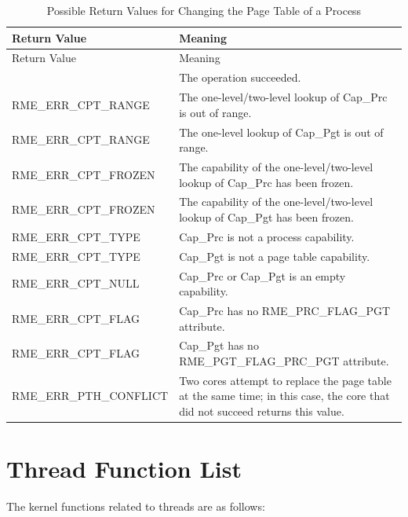 \begin{xltabular}{\textwidth}{@{}>{\hsize\raggedright\arraybackslash}X>{\hsize\raggedright\arraybackslash}X@{}}
\caption{Possible Return Values for Changing the Page Table of a Process}\label{tab:4-17-change-process-page-table-return-values}\\
\toprule
Return Value & Meaning\tabularnewline
\endfirsthead
\toprule
Return Value & Meaning\tabularnewline
\midrule
\endhead
\bottomrule
{} & The operation succeeded.\tabularnewline
    RME\_ERR\_CPT\_RANGE & The one-level/two-level lookup of Cap\_Prc is out of range.\tabularnewline
    RME\_ERR\_CPT\_RANGE & The one-level lookup of Cap\_Pgt is out of range.\tabularnewline
    RME\_ERR\_CPT\_FROZEN & The capability of the one-level/two-level lookup of Cap\_Prc has been frozen.\tabularnewline
    RME\_ERR\_CPT\_FROZEN & The capability of the one-level/two-level lookup of Cap\_Pgt has been frozen.\tabularnewline
    RME\_ERR\_CPT\_TYPE & Cap\_Prc is not a process capability.\tabularnewline
    RME\_ERR\_CPT\_TYPE & Cap\_Pgt is not a page table capability.\tabularnewline
    RME\_ERR\_CPT\_NULL & Cap\_Prc or Cap\_Pgt is an empty capability.\tabularnewline
    RME\_ERR\_CPT\_FLAG & Cap\_Prc has no RME\_PRC\_FLAG\_PGT attribute.\tabularnewline
    RME\_ERR\_CPT\_FLAG & Cap\_Pgt has no RME\_PGT\_FLAG\_PRC\_PGT attribute.\tabularnewline
    RME\_ERR\_PTH\_CONFLICT & Two cores attempt to replace the page table at the same time; in this case, the core that did not succeed returns this value.\tabularnewline
\end{xltabular}
\nopagebreak[4]

\section{Thread Function List}\label{sec:4-thread-function-list}

The kernel functions related to threads are as follows:

